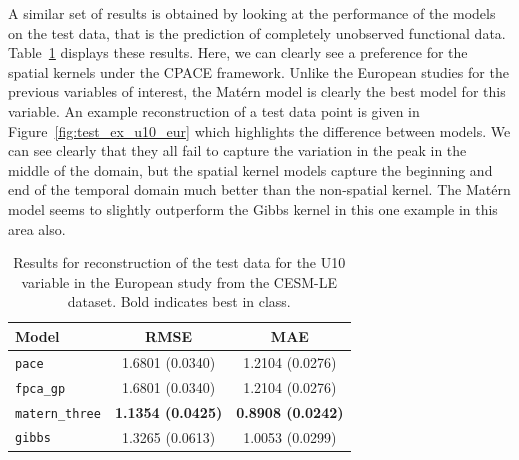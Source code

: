A similar set of results is obtained by looking at the performance of the models on the test data, that is the prediction of completely unobserved functional data.
Table~\ref{tab:test_cesm_u10_eur} displays these results.
Here, we can clearly see a preference for the spatial kernels under the CPACE framework.
Unlike the European studies for the previous variables of interest, the Mat\'ern model is clearly the best model for this variable.
An example reconstruction of a test data point is given in Figure~\ref{fig:test_ex_u10_eur} which highlights the difference between models. 
We can see clearly that they all fail to capture the variation in the peak in the middle of the domain, but the spatial kernel models capture the beginning and end of the temporal domain much better than the non-spatial kernel. 
The Mat\'ern model seems to slightly outperform the Gibbs kernel in this one example in this area also. 

\begin{table}
	\caption[Results for U10 variable on test data in the European study]{Results for reconstruction of the test data for the U10 variable in the European study from the CESM-LE dataset. Bold indicates best in class.}
	\centering
	\label{tab:test_cesm_u10_eur}
	\begin{tabular}{lcc}
		\toprule
		\textbf{Model} & \textbf{RMSE} & \textbf{MAE} \\
		\midrule
		\verb*|pace| & 1.6801 (0.0340) & 1.2104	(0.0276) \\
		\verb*|fpca_gp| & 1.6801 (0.0340) & 1.2104 (0.0276) \\
		\verb*|matern_three| & \textbf{1.1354 (0.0425)} & \textbf{0.8908 (0.0242)}\\
		\verb*|gibbs| & 1.3265 (0.0613) & 1.0053 (0.0299)\\
		\bottomrule
	\end{tabular}
\end{table}

